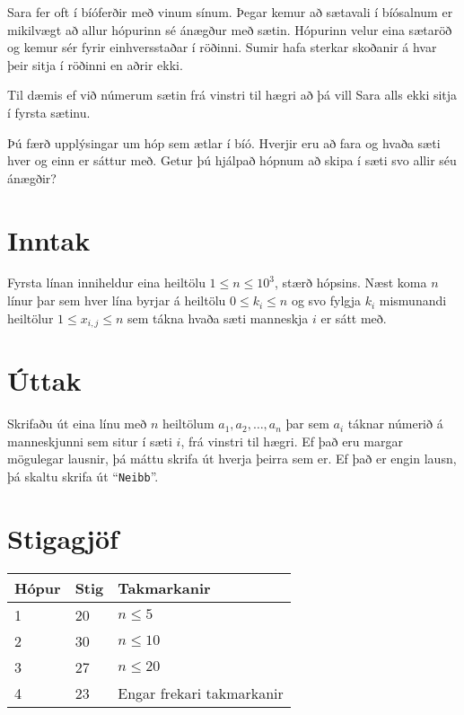 %
Sara fer oft í bíóferðir með vinum sínum.
Þegar kemur að sætavali í bíósalnum er mikilvægt að allur hópurinn sé ánægður með sætin.
Hópurinn velur eina sætaröð og kemur sér fyrir einhversstaðar í röðinni.
Sumir hafa sterkar skoðanir á hvar þeir sitja í röðinni en aðrir ekki.

Til dæmis ef við númerum sætin frá vinstri til hægri að þá vill Sara alls ekki sitja í fyrsta sætinu.

Þú færð upplýsingar um hóp sem ætlar í bíó.
Hverjir eru að fara og hvaða sæti hver og einn er sáttur með.
Getur þú hjálpað hópnum að skipa í sæti svo allir séu ánægðir?

\section*{Inntak}
Fyrsta línan inniheldur eina heiltölu $1 \leq n \leq 10^3$, stærð hópsins.
Næst koma $n$ línur þar sem hver lína byrjar á heiltölu $0 \leq k_i \leq n$
og svo fylgja $k_i$ mismunandi heiltölur $1 \leq x_{i,j} \leq n$ sem tákna hvaða sæti
manneskja $i$ er sátt með.

\section*{Úttak}
Skrifaðu út eina línu með $n$ heiltölum $a_1, a_2, \dotsc, a_n$ 
þar sem $a_i$ táknar númerið á manneskjunni sem situr í sæti $i$, frá vinstri til hægri.
Ef það eru margar mögulegar lausnir, þá máttu skrifa út hverja þeirra sem er.
Ef það er engin lausn, þá skaltu skrifa út ``\texttt{Neibb}''.

\section*{Stigagjöf}
\begin{tabular}{|l|l|l|}
\hline
Hópur & Stig & Takmarkanir \\ \hline
1     & 20   & $n \leq 5$ \\ \hline
2     & 30   & $n \leq 10$ \\ \hline
3     & 27   & $n \leq 20$\\ \hline
4     & 23   & Engar frekari takmarkanir\\ \hline
\end{tabular}

